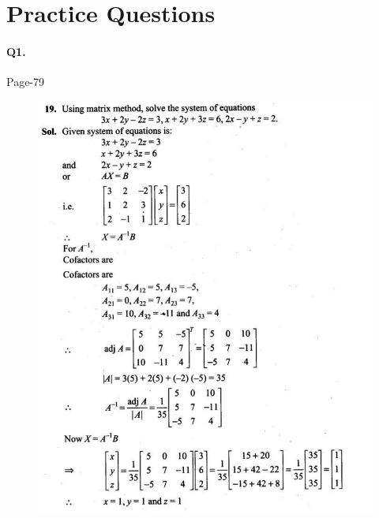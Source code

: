 \documentclass{article}
\begin{document}
\section*{Practice Questions}
\paragraph{Q1.}
\begin{flushright}
Page-79
\end{flushright}
\begin{figure}[H]
    \includegraphics[scale=0.5]{determinants_l3_ps_3.png}
\end{figure}
\end{document}

